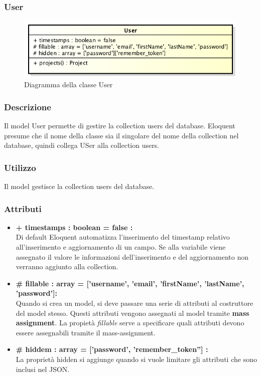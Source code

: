 \newpage
\subsubsection{User}

	\begin{figure}[h]
		\centering
		\includegraphics[width=0.7\linewidth]{img/User}
		\caption[Diagramma della classe User]{Diagramma della classe User}
		\label{fig:User}
	\end{figure}

	\subsubsection*{Descrizione}
	Il model User permette di gestire la collection users del database. Eloquent presume che il nome della classe sia il singolare del nome della collection nel database, quindi collega USer alla collection users.
	\subsubsection*{Utilizzo}
	Il model gestisce la collection users del database.
	\subsubsection*{Attributi}
	\begin{itemize}
		\item \textbf{+ timestamps : boolean = false :}\\
		Di default Eloquent automatizza l'inserimento del timestamp relativo all'inserimento e aggiornamento di un campo. Se alla variabile viene assegnato il valore le informazioni dell'inserimento e del aggiornamento non verranno aggiunto alla collection.
		\item \textbf{\# fillable : array = ['username', 'email', 'firstName', 'lastName', 'password']:}\\
		Quando si crea un model, si deve passare una serie di attributi al costruttore del model stesso. Questi attributi vengono assegnati al model tramite \textbf{mass assignment}. La propietà \textit{fillable} serve a specificare quali attributi devono essere assegnabili tramite il mass-assignment.
		\item \textbf{\# hiddem : array = ['password', 'remember\_token''] : }\\
		La proprietà hidden si aggiunge quando si vuole limitare gli attributi che sono inclusi nel JSON.
	\end{itemize}

